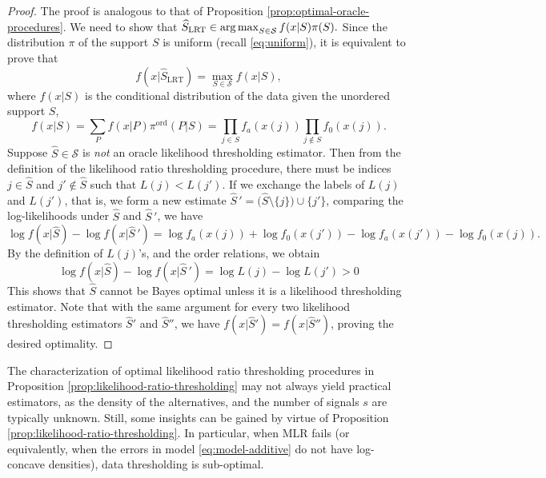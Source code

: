 \begin{proof}%
The proof is analogous to that of Proposition \ref{prop:optimal-oracle-procedures}.
We need to show that
$
\widehat{S}_{\rm LRT} \in \operatorname*{arg\,max}_{S \in \mathcal{S}} f(x|S) \pi(S).
$
Since the distribution $\pi$ of the support $S$ 
is uniform (recall \eqref{eq:uniform}), it is equivalent to prove that 
$$
f(x|\widehat{S}_{\text{LRT}}) = \max_{S \in \mathcal {S}} f(x|S),
$$ 
where  $f(x|S)$ is the conditional distribution of the data given the unordered support $S$,
\begin{equation} \label{eq:likelihood-ratio-thresholding-proof}
    f(x|S) = \sum_P f(x|P) \pi^{\text{ord}}(P|S) = \prod_{j\in S} f_a(x(j)) \prod_{j\not\in S}{f_0(x(j))}.
\end{equation}
Suppose $\widehat S\in {\mathcal S}$ is {\em not} an oracle likelihood thresholding estimator. 
Then from the definition of the likelihood ratio thresholding procedure, there 
must be indices 
$j \in \widehat S$ and $j' \not \in \widehat{S}$ such that $L(j) < L(j')$.
If we exchange the labels of $L(j)$ and $L(j')$, that is, we form a new estimate 
$\widehat{S}\,' = \big(\widehat{S}\setminus\{j\}\big)\cup\{j'\}$,
comparing the log-likelihoods under $\widehat{S}$ and $\widehat{S}\,'$, we have
\begin{equation*}
    \log{f(x|\widehat{S})} - \log{f(x|\widehat{S}\,')} 
    = \log{f_a(x(j))} + \log{f_0(x(j'))} - \log{f_a(x(j'))} - \log{f_0(x(j))}.
\end{equation*}
By the definition of $L(j)$'s, and the order relations, we obtain
\begin{equation*}
    \log{f(x|\widehat{S})} - \log{f(x|\widehat{S}\,')} 
    = \log{L(j)} - \log{L(j')} > 0
\end{equation*}
This shows that $\widehat S$ cannot be Bayes optimal unless it is a likelihood thresholding estimator.
Note that with the same argument for every two likelihood thresholding estimators $\widehat S'$
and $\widehat S''$, we have $ f(x|\widehat{S}') = f(x|\widehat{S}'')$, proving the desired optimality.
\end{proof}


The characterization of optimal likelihood ratio thresholding procedures in Proposition \ref{prop:likelihood-ratio-thresholding} may not always yield practical estimators, as the density of the alternatives, and the number of signals $s$ 
are typically unknown. Still, some insights can be gained by virtue of Proposition \ref{prop:likelihood-ratio-thresholding}.
In particular, when MLR fails (or equivalently, when the errors in model \eqref{eq:model-additive} do not have log-concave densities), data thresholding is sub-optimal. 


